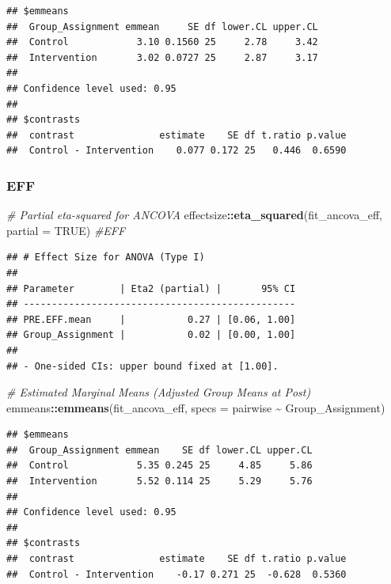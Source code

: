\documentclass[
]{article}
\newenvironment{Shaded}{\begin{snugshade}}{\end{snugshade}}
\newcommand{\AttributeTok}[1]{\textcolor[rgb]{0.13,0.29,0.53}{#1}}
\newcommand{\CommentTok}[1]{\textcolor[rgb]{0.56,0.35,0.01}{\textit{#1}}}
\newcommand{\ConstantTok}[1]{\textcolor[rgb]{0.56,0.35,0.01}{#1}}
\newcommand{\FunctionTok}[1]{\textcolor[rgb]{0.13,0.29,0.53}{\textbf{#1}}}
\newcommand{\NormalTok}[1]{#1}
\newcommand{\SpecialCharTok}[1]{\textcolor[rgb]{0.81,0.36,0.00}{\textbf{#1}}}
\begin{document}
\begin{verbatim}
## $emmeans
##  Group_Assignment emmean     SE df lower.CL upper.CL
##  Control            3.10 0.1560 25     2.78     3.42
##  Intervention       3.02 0.0727 25     2.87     3.17
## 
## Confidence level used: 0.95 
## 
## $contrasts
##  contrast               estimate    SE df t.ratio p.value
##  Control - Intervention    0.077 0.172 25   0.446  0.6590
\end{verbatim}

\subsubsection{EFF}\label{eff}

\begin{Shaded}
\begin{Highlighting}[]
\CommentTok{\# Partial eta{-}squared for ANCOVA}
\NormalTok{effectsize}\SpecialCharTok{::}\FunctionTok{eta\_squared}\NormalTok{(fit\_ancova\_eff, }\AttributeTok{partial =} \ConstantTok{TRUE}\NormalTok{) }\CommentTok{\#EFF}
\end{Highlighting}
\end{Shaded}

\begin{verbatim}
## # Effect Size for ANOVA (Type I)
## 
## Parameter        | Eta2 (partial) |       95% CI
## ------------------------------------------------
## PRE.EFF.mean     |           0.27 | [0.06, 1.00]
## Group_Assignment |           0.02 | [0.00, 1.00]
## 
## - One-sided CIs: upper bound fixed at [1.00].
\end{verbatim}

\begin{Shaded}
\begin{Highlighting}[]
\CommentTok{\# Estimated Marginal Means (Adjusted Group Means at Post)}
\NormalTok{emmeans}\SpecialCharTok{::}\FunctionTok{emmeans}\NormalTok{(fit\_ancova\_eff, }\AttributeTok{specs =}\NormalTok{ pairwise }\SpecialCharTok{\textasciitilde{}}\NormalTok{ Group\_Assignment)}
\end{Highlighting}
\end{Shaded}

\begin{verbatim}
## $emmeans
##  Group_Assignment emmean    SE df lower.CL upper.CL
##  Control            5.35 0.245 25     4.85     5.86
##  Intervention       5.52 0.114 25     5.29     5.76
## 
## Confidence level used: 0.95 
## 
## $contrasts
##  contrast               estimate    SE df t.ratio p.value
##  Control - Intervention    -0.17 0.271 25  -0.628  0.5360
\end{verbatim}
\end{document}
